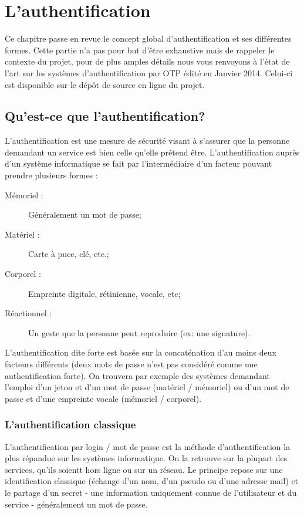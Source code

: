 \chapter{L'authentification}

	Ce chapitre passe en revue le concept global d'authentification et ses
	différentes formes. Cette partie n'a pas pour but d'être exhaustive mais
	de rappeler le contexte du projet, pour de plus amples détails nous vous
	renvoyons à l'état de l'art sur les systèmes d'authentification par OTP
	édité en Janvier 2014. Celui-ci est disponible sur le dépôt de source en
	ligne du projet.

\section{Qu'est-ce que l'authentification?}

	L'authentification est une mesure de sécurité visant à s'assurer que la
	personne demandant un service est bien celle qu'elle prétend être.
	L'authentification auprès d'un système informatique se fait par
	l'intermédiaire d'un facteur pouvant prendre plusieurs formes :

	\begin{description}
		\item[Mémoriel :] Généralement un mot de passe;
		\item[Matériel :] Carte à puce, clé, etc.;
		\item[Corporel :] Empreinte digitale, rétinienne, vocale, etc;
		\item[Réactionnel :] Un geste que la personne peut reproduire (ex: une
		signature).
	\end{description}

	L'authentification dite forte est basée sur la concaténation d'au moins
	deux facteurs différents (deux mots de passe n'est pas considéré comme une
	authentification forte). On trouvera par exemple des systèmes demandant
	l'emploi d'un jeton et d'un mot de passe (matériel / mémoriel) ou d'un mot
	de passe et d'une empreinte vocale (mémoriel / corporel).

\subsection{L'authentification classique}

	L'authentification par login / mot de passe est la méthode
	d'authentification la plus répandue sur les systèmes informatique. On la
	retrouve sur la plupart des services, qu'ils soientt hors ligne ou sur un
	réseau. Le principe repose sur une identification classique (échange d'un
	nom, d'un pseudo ou d'une adresse mail) et le partage d'un secret - une
	information uniquement connue de l'utilisateur et du service -
	généralement un mot de passe.

